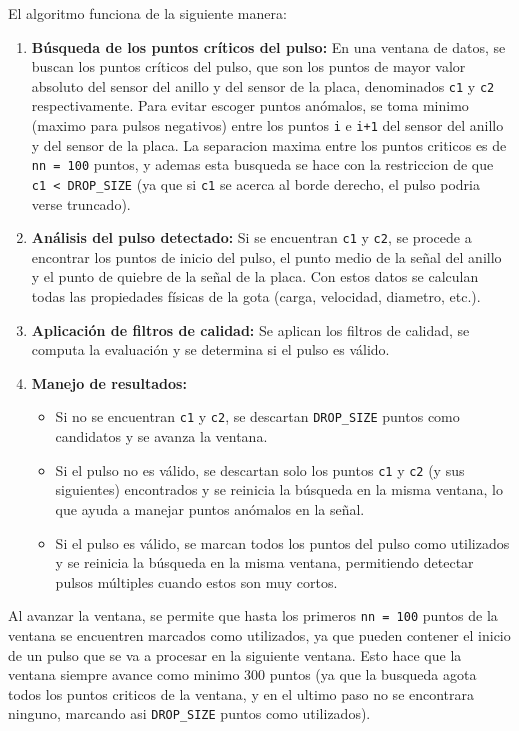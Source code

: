 \documentclass[12pt,a4paper]{article}
\begin{document}
El algoritmo funciona de la siguiente manera:

\begin{enumerate}
    \item \textbf{Búsqueda de los puntos críticos del pulso:} En una ventana de datos, se buscan los puntos críticos del pulso, que son los puntos de mayor valor absoluto del sensor del anillo y del sensor de la placa, denominados \texttt{c1} y \texttt{c2} respectivamente. Para evitar escoger puntos anómalos, se toma minimo (maximo para pulsos negativos) entre los puntos \texttt{i} e \texttt{i+1} del sensor del anillo y del sensor de la placa. La separacion maxima entre los puntos criticos es de \texttt{nn = 100} puntos, y ademas esta busqueda se hace con la restriccion de que \texttt{c1 <\ DROP\_SIZE} (ya que si \texttt{c1} se acerca al borde derecho, el pulso podria verse truncado).
    
    \item \textbf{Análisis del pulso detectado:} Si se encuentran \texttt{c1} y \texttt{c2}, se procede a encontrar los puntos de inicio del pulso, el punto medio de la señal del anillo y el punto de quiebre de la señal de la placa. Con estos datos se calculan todas las propiedades físicas de la gota (carga, velocidad, diametro, etc.).
    
    \item \textbf{Aplicación de filtros de calidad:} Se aplican los filtros de calidad, se computa la evaluación y se determina si el pulso es válido.
    
    \item \textbf{Manejo de resultados:} 
    \begin{itemize}
        \item Si no se encuentran \texttt{c1} y \texttt{c2}, se descartan \texttt{DROP\_SIZE} puntos como candidatos y se avanza la ventana.
        \item Si el pulso no es válido, se descartan solo los puntos \texttt{c1} y \texttt{c2} (y sus siguientes) encontrados y se reinicia la búsqueda en la misma ventana, lo que ayuda a manejar puntos anómalos en la señal.
        \item Si el pulso es válido, se marcan todos los puntos del pulso como utilizados y se reinicia la búsqueda en la misma ventana, permitiendo detectar pulsos múltiples cuando estos son muy cortos.
    \end{itemize}
\end{enumerate}

Al avanzar la ventana, se permite que hasta los primeros \texttt{nn = 100} puntos de la ventana se encuentren marcados como utilizados, ya que pueden contener el inicio de un pulso que se va a procesar en la siguiente ventana. Esto hace que la ventana siempre avance como minimo 300 puntos (ya que la busqueda agota todos los puntos criticos de la ventana, y en el ultimo paso no se encontrara ninguno, marcando asi \texttt{DROP\_SIZE} puntos como utilizados).
\end{document}
